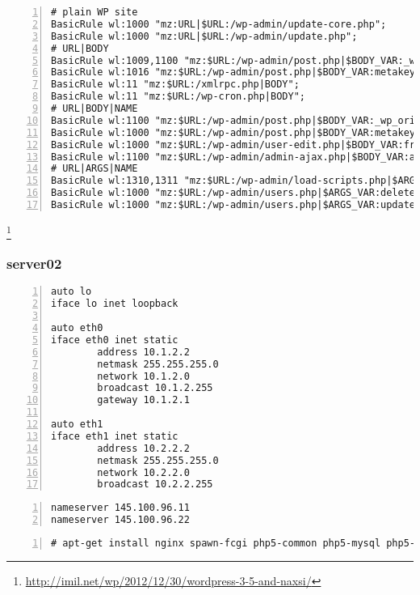 \documentclass[Configuration]{subfiles}
\begin{document}
\begin{lstlisting}[frame=single,caption=Wordpress whitelist rules,backgroundcolor=\color{gray},breaklines=true,numbers=left,]
# plain WP site
BasicRule wl:1000 "mz:URL|$URL:/wp-admin/update-core.php";
BasicRule wl:1000 "mz:URL|$URL:/wp-admin/update.php";
# URL|BODY
BasicRule wl:1009,1100 "mz:$URL:/wp-admin/post.php|$BODY_VAR:_wp_http_referer";
BasicRule wl:1016 "mz:$URL:/wp-admin/post.php|$BODY_VAR:metakeyselect";
BasicRule wl:11 "mz:$URL:/xmlrpc.php|BODY";
BasicRule wl:11 "mz:$URL:/wp-cron.php|BODY";
# URL|BODY|NAME
BasicRule wl:1100 "mz:$URL:/wp-admin/post.php|$BODY_VAR:_wp_original_http_referer|NAME";
BasicRule wl:1000 "mz:$URL:/wp-admin/post.php|$BODY_VAR:metakeyselect|NAME";
BasicRule wl:1000 "mz:$URL:/wp-admin/user-edit.php|$BODY_VAR:from|NAME";
BasicRule wl:1100 "mz:$URL:/wp-admin/admin-ajax.php|$BODY_VAR:attachment%5burl%5d|NAME";
# URL|ARGS|NAME
BasicRule wl:1310,1311 "mz:$URL:/wp-admin/load-scripts.php|$ARGS_VAR:load[]|NAME";
BasicRule wl:1000 "mz:$URL:/wp-admin/users.php|$ARGS_VAR:delete_count|NAME";
BasicRule wl:1000 "mz:$URL:/wp-admin/users.php|$ARGS_VAR:update|NAME";
\end{lstlisting}\footnote{\url{http://imil.net/wp/2012/12/30/wordpress-3-5-and-naxsi/}}

\subsubsection{server02}
\label{sec:server02_configuration}


\begin{lstlisting}[frame=single,caption=/etc/network/interfaces,backgroundcolor=\color{gray},breaklines=true,numbers=left,]
auto lo
iface lo inet loopback

auto eth0
iface eth0 inet static
        address 10.1.2.2
        netmask 255.255.255.0
        network 10.1.2.0
        broadcast 10.1.2.255
        gateway 10.1.2.1

auto eth1
iface eth1 inet static
        address 10.2.2.2
        netmask 255.255.255.0
        network 10.2.2.0
        broadcast 10.2.2.255
\end{lstlisting}

\begin{lstlisting}[frame=single,caption=/etc/resolv.conf,backgroundcolor=\color{gray},breaklines=true,numbers=left,]
nameserver 145.100.96.11
nameserver 145.100.96.22
\end{lstlisting}

\begin{lstlisting}[frame=single,caption=necessary packages,backgroundcolor=\color{gray},breaklines=true,numbers=left,]
# apt-get install nginx spawn-fcgi php5-common php5-mysql php5-xmlrpc php5-cgi php5-curl php5-gd php5-cli  php-apc php-pear php5-dev php5-imap php5-mcrypt
\end{lstlisting}
\end{document}
